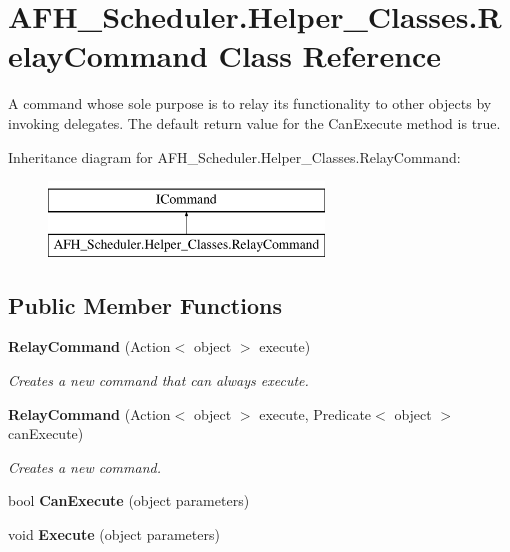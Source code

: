 \section{A\+F\+H\+\_\+\+Scheduler.\+Helper\+\_\+\+Classes.\+Relay\+Command Class Reference}
\label{class_a_f_h___scheduler_1_1_helper___classes_1_1_relay_command}


A command whose sole purpose is to relay its functionality to other objects by invoking delegates. The default return value for the Can\+Execute method is \textquotesingle{}true\textquotesingle{}.  


Inheritance diagram for A\+F\+H\+\_\+\+Scheduler.\+Helper\+\_\+\+Classes.\+Relay\+Command\+:\begin{figure}[H]
\begin{center}
\leavevmode
\includegraphics[height=2.000000cm]{class_a_f_h___scheduler_1_1_helper___classes_1_1_relay_command}
\end{center}
\end{figure}
\subsection*{Public Member Functions}
\begin{DoxyCompactItemize}
\item 
\textbf{ Relay\+Command} (Action$<$ object $>$ execute)
\begin{DoxyCompactList}\small\item\em Creates a new command that can always execute. \end{DoxyCompactList}\item 
\textbf{ Relay\+Command} (Action$<$ object $>$ execute, Predicate$<$ object $>$ can\+Execute)
\begin{DoxyCompactList}\small\item\em Creates a new command. \end{DoxyCompactList}\item 
\mbox{\label{class_a_f_h___scheduler_1_1_helper___classes_1_1_relay_command_a2aa7e10167235d08223fab7d5d9844ed}} 
bool {\bfseries Can\+Execute} (object parameters)
\item 
\mbox{\label{class_a_f_h___scheduler_1_1_helper___classes_1_1_relay_command_a6b2a2d71fadd06b09b58c28d71036286}} 
void {\bfseries Execute} (object parameters)
\end{DoxyCompactItemize}
